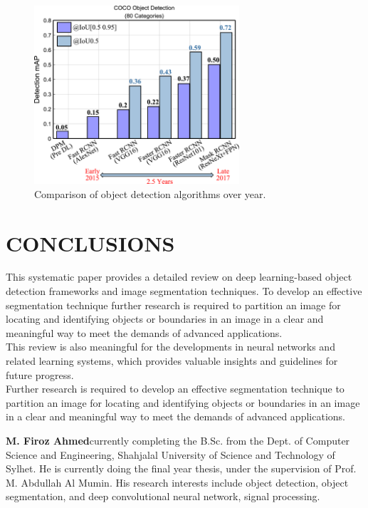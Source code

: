 \documentclass[two column]{ieeeaccess}
\begin{document}
\begin{figure}[h]
    \centering
    \includegraphics[width=3in]{q6.PNG}
    \caption{Comparison of object detection algorithms over year.}
    \label{fig18}
\end{figure}




\section{CONCLUSIONS}
This systematic paper provides a detailed review on deep learning-based object detection frameworks and image segmentation techniques. To develop an effective segmentation technique further research is required to partition an image for locating and identifying objects or boundaries in an image in a clear and meaningful way to meet the demands of advanced applications. \\
This review is also meaningful for the developments in neural networks and related learning systems, which provides valuable insights and guidelines for future progress.   \\
Further research is required to develop an effective segmentation technique to partition an image for locating and identifying objects or boundaries in an image in a clear and meaningful way to meet the demands of advanced applications. \\







\begin{IEEEbiography}{\textbf{M. Firoz Ahmed}}currently completing the B.Sc. from the Dept. of Computer Science and Engineering, Shahjalal University of Science and Technology of Sylhet. He is currently doing the final year thesis, under the supervision of Prof. M. Abdullah Al Mumin. His research interests include object detection, object segmentation, and deep convolutional neural network, signal processing.
\end{IEEEbiography}
\end{document}
